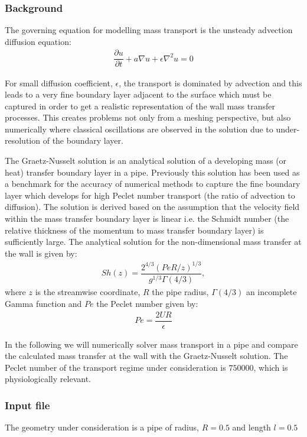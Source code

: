 \subsubsection{Background}
The governing equation for modelling mass transport is the unsteady advection
diffusion equation:
\begin{align*}
\dfrac{\partial u}{\partial t}  + a\nabla u +  \epsilon \nabla^2 u = 0
\end{align*}

For small diffusion coefficient, $\epsilon$, the transport is dominated by
advection and this leads to a very fine boundary layer adjacent to the surface
which must be captured in order to get a realistic representation of the wall
mass transfer processes. This creates problems not only from a meshing
perspective, but also numerically where classical oscillations are observed in
the solution due to under-resolution of the boundary layer.

The Graetz-Nusselt solution is an analytical solution of a developing mass (or
heat) transfer boundary layer in a pipe. Previously this solution has been used
as a benchmark for the accuracy of numerical methods to capture the fine
boundary layer which develops for high Peclet number transport (the ratio of
advection to diffusion). The solution is derived based on the assumption that
the velocity field within the mass transfer boundary layer is linear i.e. the
Schmidt number (the relative thickness of the momentum to mass transfer boundary
layer) is sufficiently large. The analytical solution for the non-dimensional
mass transfer at the wall is given by:
\begin{align*}
S h(z) = \dfrac{2^{4/3}(Pe R/z)^{1/3}}{g^{1/3}\Gamma(4/3)} ,
\end{align*}
where $z$ is the streamwise coordinate, $R$ the pipe radius, $\Gamma(4/3)$ an incomplete
Gamma function and $Pe$ the Peclet number given by:
\begin{align*}
Pe = \dfrac{2 U R}{\epsilon}
\end{align*}

In the following we will numerically solver mass transport in a pipe and compare
the calculated mass transfer at the wall with the Graetz-Nusselt solution. The
Peclet number of the transport regime under consideration is $750000$, which is
physiologically relevant.

\subsubsection{Input file}
The geometry under consideration is a pipe of radius, $R = 0.5$ and length $l =
0.5$


